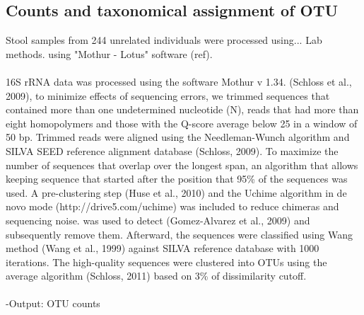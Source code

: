 \documentclass[10pt,letterpaper]{article}
\begin{document}
\subsection*{Counts and taxonomical assignment of OTU}
Stool samples from 244 unrelated individuals were processed using... Lab methods. using "Mothur - Lotus" software (ref).
\\\\
16S rRNA data was processed using the software Mothur v 1.34. (Schloss et al., 2009), to minimize effects of sequencing errors, we trimmed sequences that contained more than one undetermined nucleotide (N), reads that had more than eight homopolymers and those with the Q-score average below 25 in a window of 50 bp. Trimmed reads were aligned using the Needleman-Wunch algorithm and SILVA SEED reference alignment database (Schloss, 2009). To maximize the number of sequences that overlap over the longest span, an algorithm that allows keeping sequence that started after the position that 95\% of the sequences was used. A pre-clustering step (Huse et al., 2010) and the Uchime algorithm in de novo mode (http://drive5.com/uchime)  was included to reduce chimeras and sequencing noise. was used to detect  (Gomez-Alvarez et al., 2009) and subsequently remove them. Afterward, the sequences were classified using Wang method (Wang et al., 1999) against SILVA reference database with 1000 iterations. The high-quality sequences were clustered into OTUs using the average algorithm (Schloss, 2011) based on 3\% of dissimilarity cutoff.
\\\\
-Output: OTU counts
\\
\end{document}
